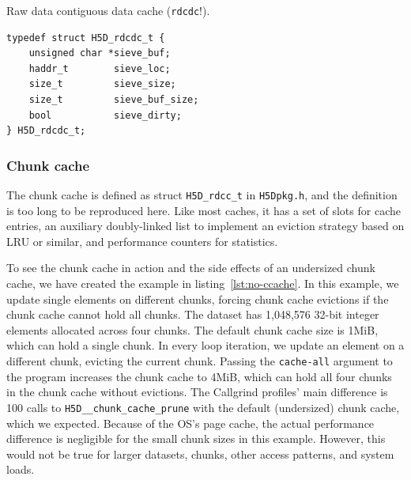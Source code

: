 \begin{listing}
\centering
\caption{Raw data contiguous data cache (\texttt{rdcdc}!).}
\label{lst:rdcdc}
\begin{verbatim}
typedef struct H5D_rdcdc_t {
    unsigned char *sieve_buf;
    haddr_t        sieve_loc;
    size_t         sieve_size;
    size_t         sieve_buf_size;
    bool           sieve_dirty;
} H5D_rdcdc_t;
\end{verbatim}
\end{listing}

\subsubsection{Chunk cache}

The chunk cache is defined as struct \texttt{H5D\_rdcc\_t} in \texttt{H5Dpkg.h}, and the definition is too long to be reproduced here. Like most caches, it has a set of slots for cache entries, an auxiliary doubly-linked list to implement an eviction strategy based on LRU or similar, and performance counters for statistics.

To see the chunk cache in action and the side effects of an undersized chunk cache, we have created the example in listing~\ref{lst:no-ccache}. In this example, we update single elements on different chunks, forcing chunk cache evictions if the chunk cache cannot hold all chunks. The dataset has 1,048,576 32-bit integer elements allocated across four chunks. The default chunk cache size is 1MiB, which can hold a single chunk. In every loop iteration, we update an element on a different chunk, evicting the current chunk. Passing the \texttt{cache-all} argument to the program increases the chunk cache to 4MiB, which can hold all four chunks in the chunk cache without evictions. The Callgrind profiles' main difference is 100 calls to \texttt{H5D\_\_chunk\_cache\_prune} with the default (undersized) chunk cache, which we expected. Because of the OS's page cache, the actual performance difference is negligible for the small chunk sizes in this example. However, this would not be true for larger datasets, chunks, other access patterns, and system loads.

